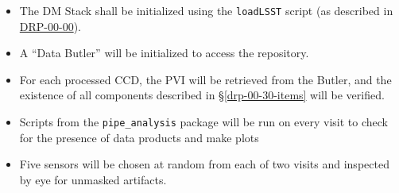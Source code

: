 \begin{itemize}

  \item{The DM Stack shall be initialized using the \texttt{loadLSST} script
  (as described in \hyperref[drp-00-00]{DRP-00-00}).}

  \item{A ``Data Butler'' will be initialized to access the repository.}

  \item{For each processed CCD, the PVI will be retrieved from the Butler, and
  the existence of all components described in \S\ref{drp-00-30-items} will be
  verified.}

  \item{Scripts from the \texttt{pipe\_analysis} package will be run on every visit to check for the presence of data products and make plots}

  \item{Five sensors will be chosen at random from each of two visits and inspected by eye for unmasked artifacts.}

\end{itemize}
